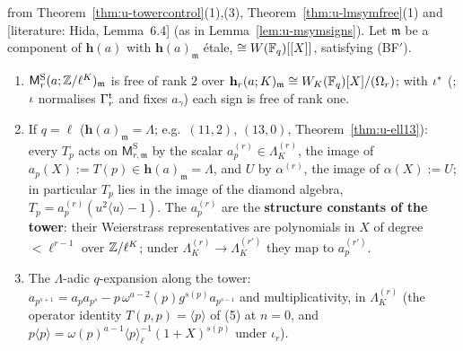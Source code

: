 \documentclass[11pt]{article}
\newcommand{\LIT}[1]{\textsf{[literature: #1]}}   %
\newcommand{\Iw}{\Lambda}                         %
\newcommand{\hcusp}{\mathbf{h}}                   %
\newcommand{\cusp}{\mathrm{S}}
\newcommand{\GaT}[1]{\Ga^{\mathrm t}_{#1}}            %
\newcommand{\Om}[1]{\Omega_{#1}}                      %
\newcommand{\IwT}[2]{\Iw^{(#2)}_{#1}}                 %
\begin{document}
\begin{proposition}\label{prop:u-towerfree}
\PROVED{} from Theorem~\ref{thm:u-towercontrol}(1),(3), Theorem~\ref{thm:u-lmsymfree}(1) and \LIT{Hida, Lemma~6.4} (as in Lemma~\ref{lem:u-msymsigns}). Let $\mathfrak m$ be a component of $\hcusp(a)$ with
$\hcusp(a)_{\mathfrak m}$ étale, $\cong W(\mathbb{F}_q)[[X]]$, satisfying (BF$'$).
\begin{enumerate}
\item $\mathsf M^{\cusp}_r(a;\Z/\ell^{K})_{\mathfrak m}$ is free of rank $2$ over $\hcusp_r(a;K)_{\mathfrak m}\cong W_K(\F_q)[X]/(\Om r)$; with $\iota^{\ast}$ (; $\iota$ normalises $\GaT r$ and fixes
  $a_\gamma$) each sign is free of rank one.
\item If $q=\ell$ ($\hcusp(a)_{\mathfrak m}=\Iw$; e.g.\ $(11,2)$, $(13,0)$, Theorem~\ref{thm:u-ell13}): every $T_p$ acts on $\mathsf M^{\cusp}_{r,\mathfrak m}$ by the scalar $a^{(r)}_p\in\IwT Kr$, the image of
  $a_p(X):=T(p)\in\hcusp(a)_{\mathfrak m}=\Iw$, and $U$ by $\alpha^{(r)}$, the image of $\alpha(X):=U$; in particular $T_p$ lies in the image of the diamond algebra, $T_p=a^{(r)}_p(u^{2}\langle u\rangle-1)$.
  The $a^{(r)}_p$ are the \textbf{structure constants of the tower}: their Weierstrass representatives are polynomials in $X$ of degree $<\ell^{r-1}$ over $\mathbb{Z}/\ell^{K}$; under
  $\IwT Kr\to\IwT K{r'}$ they map to $a^{(r')}_p$.
\item The $\Iw$-adic $q$-expansion along the tower: $a_{p^{s+1}}=a_pa_{p^{s}}-p\,\omega^{a-2}(p)g^{s(p)}a_{p^{s-1}}$ and multiplicativity, in $\IwT Kr$ (the operator identity $T(p,p)=\langle p\rangle$ of
  (5) at $n=0$, and $p\langle p\rangle=\omega(p)^{a-1}\langle p\rangle_\ell^{-1}(1+X)^{s(p)}$ under $\iota_r$).
\end{enumerate}
\end{proposition}
\end{document}
